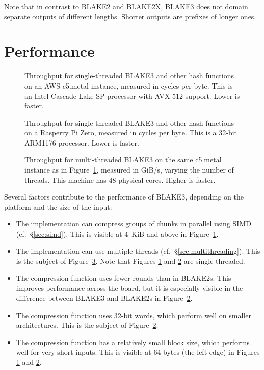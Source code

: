 \documentclass[11pt,notitlepage,a4paper]{article}
\begin{document}
Note that in contrast to BLAKE2 and BLAKE2X, BLAKE3 does not domain separate
outputs of different lengths. Shorter outputs are prefixes of longer ones.

\section{Performance}\label{sec:performance}

\begin{figure}[h]
\centering

\caption{Throughput for single-threaded BLAKE3 and other hash functions on an
    AWS c5.metal instance, measured in cycles per byte. This is an Intel
    Cascade Lake-SP processor with AVX-512 support. Lower is faster.}%
\label{fig:avx512}
\end{figure}

\begin{figure}[h]
\centering
%

\caption{Throughput for single-threaded BLAKE3 and other hash functions on a
    Rasperry Pi Zero, measured in cycles per byte. This is a 32-bit ARM1176
    processor. Lower is faster.}%
\label{fig:rpizero}
\end{figure}

\begin{figure}[h]
\centering

    \caption{Throughput for multi-threaded BLAKE3 on the same c5.metal instance
    as in Figure~\ref{fig:avx512}, measured in GiB/s, varying the number of
    threads. This machine has 48 physical cores. Higher is faster.}%
\label{fig:threads}
\end{figure}

Several factors contribute to the performance of BLAKE3, depending on the
platform and the size of the input:

\begin{itemize}
    \item The implementation can compress groups of chunks in parallel using
        SIMD (cf.~\S\ref{sec:simd}). This is visible at 4~KiB and above in
        Figure~\ref{fig:avx512}.
    \item The implementation can use multiple threads
        (cf.~\S\ref{sec:multithreading}). This is the subject of
        Figure~\ref{fig:threads}. Note that Figures \ref{fig:avx512} and
        \ref{fig:rpizero} are single-threaded.
    \item The compression function uses fewer rounds than in BLAKE2s. This
        improves performance across the board, but it is especially visible in
        the difference between BLAKE3 and BLAKE2s in Figure~\ref{fig:rpizero}.
    \item The compression function uses 32-bit words, which perform well on
        smaller architectures. This is the subject of Figure~\ref{fig:rpizero}.
    \item The compression function has a relatively small block size, which
        performs well for very short inputs. This is visible at 64 bytes (the
        left edge) in Figures \ref{fig:avx512} and \ref{fig:rpizero}.
\end{itemize}
\end{document}
